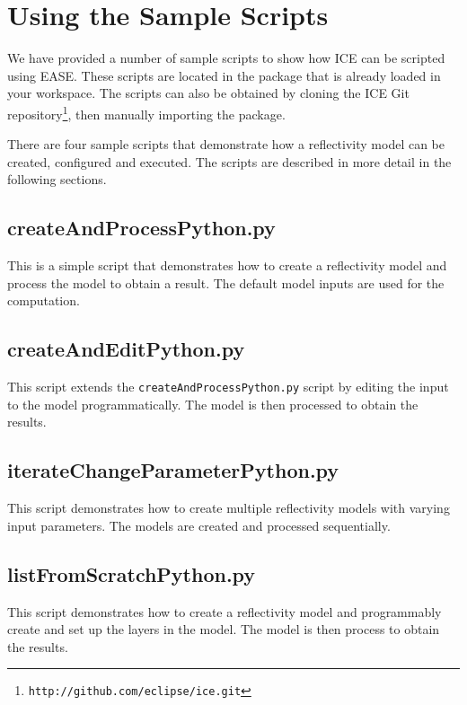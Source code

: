 \section{Using the Sample Scripts}

\lstset{basicstyle=\ttfamily\scriptsize, breaklines}
\makeatletter
\def\lst@lettertrue{\let\lst@ifletter\iffalse}
\makeatother

We have provided a number of sample scripts to show how ICE can be
scripted using EASE.
These scripts are located in the
 package that is already loaded
in your workspace. The scripts can also be obtained by cloning the ICE Git
repository\footnote{\texttt{http://github.com/eclipse/ice.git}},
then manually importing the 
package.

There are four sample scripts that demonstrate how a reflectivity model
can be created, configured and executed. The scripts are described in
more detail in the following sections.

\subsection{createAndProcessPython.py} 

This is a simple script
that demonstrates how to create a reflectivity model and process the model to
obtain a result. The default model inputs are used for the computation.



\subsection{createAndEditPython.py} 

This script extends the
\texttt{createAndProcessPython.py} script by editing the input to the model
programmatically. The model is then processed to obtain the results.



\subsection{iterateChangeParameterPython.py} 
This script demonstrates how to create
multiple reflectivity models with varying input parameters. The models are created
and processed sequentially.



\subsection{listFromScratchPython.py} 
This script demonstrates how to create a
reflectivity model and programmably create and set up the layers in the model.
The model is then process to obtain the results.


